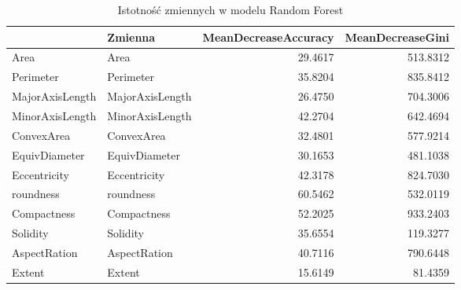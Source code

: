 \begin{table}[H]

\caption{\label{tab:importance-rf}Istotność zmiennych w modelu Random Forest}
\centering
\begin{tabular}[t]{llrr}
\toprule
  & Zmienna & MeanDecreaseAccuracy & MeanDecreaseGini\\
\midrule
Area & Area & 29.4617 & 513.8312\\
Perimeter & Perimeter & 35.8204 & 835.8412\\
MajorAxisLength & MajorAxisLength & 26.4750 & 704.3006\\
MinorAxisLength & MinorAxisLength & 42.2704 & 642.4694\\
ConvexArea & ConvexArea & 32.4801 & 577.9214\\
\addlinespace
EquivDiameter & EquivDiameter & 30.1653 & 481.1038\\
Eccentricity & Eccentricity & 42.3178 & 824.7030\\
roundness & roundness & 60.5462 & 532.0119\\
Compactness & Compactness & 52.2025 & 933.2403\\
Solidity & Solidity & 35.6554 & 119.3277\\
\addlinespace
AspectRation & AspectRation & 40.7116 & 790.6448\\
Extent & Extent & 15.6149 & 81.4359\\
\bottomrule
\end{tabular}
\end{table}

